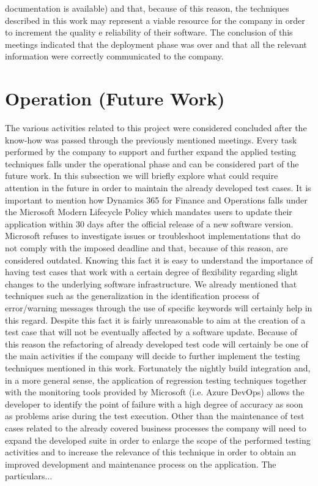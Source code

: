 documentation is available) and that, because of this reason, the  techniques described in this work may represent a viable resource for the company in order to increment the quality e reliability of their software. The conclusion of this meetings indicated that the deployment phase was over and that all the relevant information were correctly communicated to the company.

\section{Operation (Future Work)} 

The various activities related to this project were considered concluded after the know-how was passed through the previously mentioned meetings. Every task performed by the company to support and further expand the applied testing techniques falls under the operational phase and can be considered part of the future work. In this subsection we will briefly explore what could require attention in the future in order to maintain the already developed test cases. It is important to mention how Dynamics 365 for Finance and Operations falls under the Microsoft Modern Lifecycle Policy which mandates users to update their application within 30 days after the official release of a new software version. Microsoft refuses to investigate issues or troubleshoot implementations that do not comply with the imposed deadline and that, because of this reason, are considered outdated. Knowing this fact it is easy to understand the importance of having test cases that work with a certain degree of flexibility regarding slight changes to the underlying software infrastructure. We already mentioned that techniques such as the generalization in the identification process of error/warning messages through the use of specific keywords will certainly help in this regard. Despite this fact it is fairly unreasonable to aim at the creation of a test case that will not be eventually affected by a software update. Because of this reason the refactoring of already developed test code will certainly be one of the main activities if the company will decide to further implement the testing techniques mentioned in this work. Fortunately the nightly build integration and, in a more general sense, the application of regression testing techniques together with the monitoring tools provided by Microsoft (i.e. Azure DevOps) allows the developer to identify the point of failure with a high degree of accuracy as soon as problems arise during the test execution. Other than the maintenance of test cases related to the already covered business processes the company will need to expand the developed suite in order to enlarge the scope of the performed testing activities and to increase the relevance of this technique in order to obtain an improved development and maintenance process on the application. The particulars...
